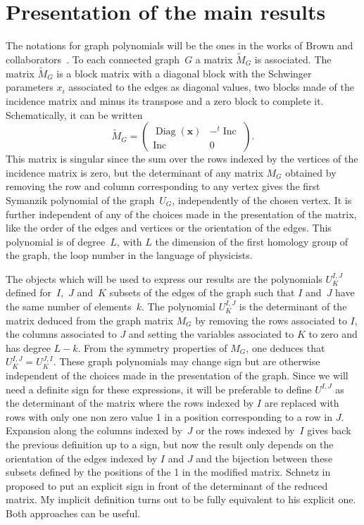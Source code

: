 \documentclass[pdftex]{sigma}
\numberwithin{equation}{section}
\begin{document}
\section{Presentation of the main results} \label{presentation}


The notations for graph polynomials will be the ones in the works of
Brown and collabora\-tors~\cite{Br2009,BrYe09}. To each connected graph~$G$ a matrix $\tilde M_G$ is associated.
The matrix $\tilde M_G$ is a block
matrix with a diagonal block with the Schwinger parameters $x_i$ associated to the edges as diagonal values, two
blocks made of the incidence matrix and minus its transpose and a zero block to complete it. Schematically, it can be written
\begin{equation*}
	\tilde M_G = \begin{pmatrix}
		\operatorname{Diag}(\mathbf{x}) & -{}^t \operatorname{Inc} \\ \operatorname{Inc} & 0
	\end{pmatrix}.
\end{equation*}
This matrix is singular since the sum over the rows indexed by the vertices of the incidence matrix is zero, but the
determinant of any matrix $M_G$ obtained by removing the row and column corresponding to any vertex gives the first
Symanzik polynomial of the graph~$U_G$, independently of the chosen vertex. It is further independent of any of the choices made in the
presentation of the matrix, like the order of the edges and vertices or the orientation of the edges. This polynomial is of degree~$L$, with
$L$ the dimension of the first homology group of the graph, the loop number in the language of physicists.

The objects which will be used to express our results are the polynomials
$U^{I ,J}_K$ defined for~$I$,~$J$ and~$K$ subsets of the edges of the graph
such that $I$ and~$J$ have the same number of elements~$k$. The polynomial
$U^{I ,J}_K$ is the determinant of the matrix deduced from the graph matrix $M_G$ by
removing the rows associated to $I$, the columns associated to $J$ and setting
the variables associated to $K$ to zero and has degree $L-k$. From the symmetry properties of $M_G$,
one deduces that $U^{I ,J}_K = U^{J,I}_K$. These graph polynomials may change sign but are otherwise independent of
the choices made in the presentation of the graph. Since
we will need a definite sign for these expressions, it will be preferable to define
$U^{I ,J}$ as the determinant of the matrix where the rows indexed by $I$ are
replaced with rows with only one non zero value 1 in a position corresponding to a row in
$J$. Expansion along the columns indexed by~$J$ or the rows indexed by~$I$ gives back the previous definition up to
a sign, but now the result only depends on the orientation of the edges indexed by
$I$ and $J $ and the bijection between these subsets
defined by the positions of the 1 in the modified matrix. Schnetz in~\cite{SC2021} proposed to put
an explicit sign in front of the determinant of the reduced matrix. My implicit definition turns out to be fully equivalent to his
explicit one. Both approaches can be useful.
\end{document}
